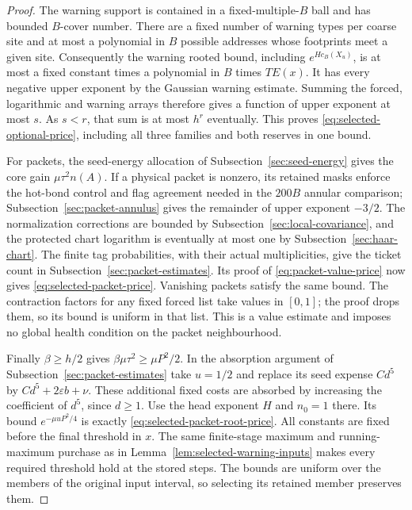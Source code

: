 \begin{proof}
The warning support is contained in a fixed-multiple-$B$ ball and has
bounded $B$-cover number. There are a fixed number of warning types per
coarse site and at most a polynomial in $B$ possible addresses whose
footprints meet a given site. Consequently the warning rooted bound,
including $e^{Hc_B(X_u)}$, is at most a fixed constant times a polynomial
in $B$ times $T E(x)$. It has every negative upper exponent by the
Gaussian warning estimate. Summing the forced, logarithmic and warning
arrays therefore gives a function of upper exponent at most $s$.
As $s<r$, that sum is at most $h^r$ eventually. This proves
\eqref{eq:selected-optional-price}, including all three families and
both reserves in one bound.

For packets, the seed-energy allocation of
Subsection~\ref{sec:seed-energy} gives the core gain $\mu\tau^2n(A)$.
If a physical packet is nonzero, its retained masks enforce the hot-bond
control and flag agreement needed in the $200B$ annular comparison;
Subsection~\ref{sec:packet-annulus} gives the remainder of upper exponent
$-3/2$. The normalization corrections are bounded by
Subsection~\ref{sec:local-covariance}, and the protected chart logarithm
is eventually at most one by Subsection~\ref{sec:haar-chart}.
The finite tag probabilities, with their actual multiplicities, give
the ticket count in Subsection~\ref{sec:packet-estimates}. Its proof of
\eqref{eq:packet-value-price} now gives
\eqref{eq:selected-packet-price}. Vanishing packets satisfy the same
bound. The contraction factors for any fixed forced list take values
in $[0,1]$; the proof drops them, so its bound is uniform in that list.
This is a value estimate and imposes no global health condition on the
packet neighbourhood.

Finally $\beta\ge h/2$ gives
$\beta\mu\tau^2\ge\mu P^2/2$. In the absorption argument of
Subsection~\ref{sec:packet-estimates} take $u=1/2$ and replace its seed
expense $Cd^5$ by $Cd^5+2\varepsilon b+\nu$. These additional fixed
costs are absorbed by increasing the coefficient of $d^5$, since
$d\ge1$. Use the head exponent $H$ and $n_0=1$ there. Its bound
$e^{-\mu uP^2/4}$ is exactly \eqref{eq:selected-packet-root-price}.
All constants are fixed before the final threshold in $x$.
The same finite-stage maximum and running-maximum purchase as in
Lemma~\ref{lem:selected-warning-inputs} makes every required threshold
hold at the stored steps. The bounds are uniform over the members of
the original input interval, so selecting its retained member preserves
them.
\end{proof}

